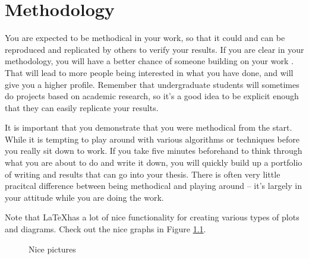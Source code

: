 \chapter{Methodology}

You are expected to be methodical in your work, so that it could and can be
reproduced and replicated by others to verify your results.
If you are clear in your methodology, you will have a better chance of someone
building on your work \cite{villaneuva18}.
That will lead to more people being interested in what you have done, and will
give you a higher profile.
Remember that undergraduate students will sometimes do projects based on
academic research, so it's a good idea to be explicit enough that they can
easily replicate your results.

It is important that you demonstrate that you were methodical from the start.
While it is tempting to play around with various algorithms or techniques
before you really sit down to work.
If you take five minutes beforehand to think through what you are about to do
and write it down, you will quickly build up a portfolio of writing and results
that can go into your thesis.
There is often very little pracitcal difference between being methodical and
playing around -- it's largely in your attitude while you are doing the work.

Note that \LaTeX has a lot of nice functionality for creating various types of
plots and diagrams.
Check out the nice graphs in Figure \ref{tikz:graphs}.

\lipsum[26]

\begin{figure}[ht]
  \centering
  \hspace{1.5cm}
  \caption{Nice pictures}
  \label{tikz:graphs}
\end{figure}

